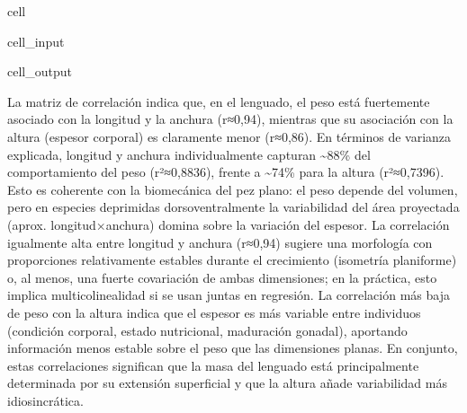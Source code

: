 \documentclass[a4paper,10pt,spanish]{jupyterBook}
\begin{document}
\begin{sphinxuseclass}{cell}
\begin{sphinxVerbatimInput}
\begin{sphinxuseclass}{cell_input}
\end{sphinxuseclass}\end{sphinxVerbatimInput}
\begin{sphinxVerbatimOutput}

\begin{sphinxuseclass}{cell_output}
\noindent{}

\end{sphinxuseclass}\end{sphinxVerbatimOutput}

\end{sphinxuseclass}
\sphinxAtStartPar
La matriz de correlación indica que, en el lenguado, el peso está fuertemente asociado con la longitud y la anchura (r≈0,94), mientras que su asociación con la altura (espesor corporal) es claramente menor (r≈0,86). En términos de varianza explicada, longitud y anchura individualmente capturan \textasciitilde{}88\% del comportamiento del peso (r²≈0,8836), frente a \textasciitilde{}74\% para la altura (r²≈0,7396). Esto es coherente con la biomecánica del pez plano: el peso depende del volumen, pero en especies deprimidas dorsoventralmente la variabilidad del área proyectada (aprox. longitud×anchura) domina sobre la variación del espesor. La correlación igualmente alta entre longitud y anchura (r≈0,94) sugiere una morfología con proporciones relativamente estables durante el crecimiento (isometría planiforme) o, al menos, una fuerte covariación de ambas dimensiones; en la práctica, esto implica multicolinealidad si se usan juntas en regresión. La correlación más baja de peso con la altura indica que el espesor es más variable entre individuos (condición corporal, estado nutricional, maduración gonadal), aportando información menos estable sobre el peso que las dimensiones planas. En conjunto, estas correlaciones significan que la masa del lenguado está principalmente determinada por su extensión superficial y que la altura añade variabilidad más idiosincrática.
\end{document}
